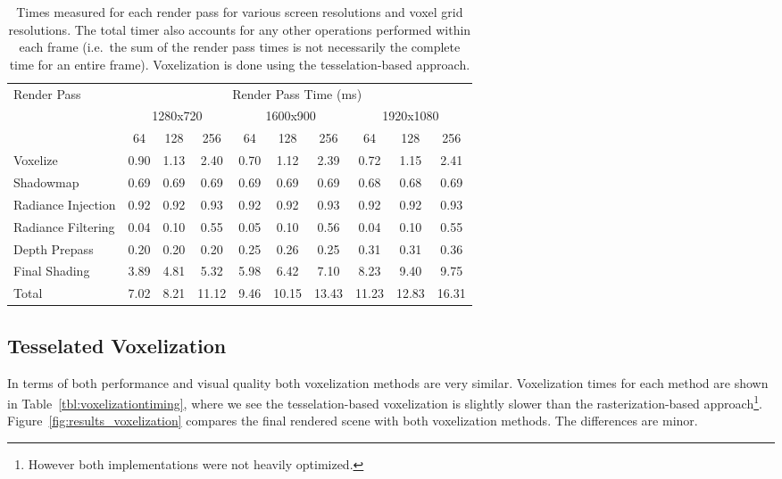 \begin{table}[H]
\centering
\begin{tabular}{l ccc ccc ccc}
\toprule
Render Pass & \multicolumn{9}{c}{Render Pass Time (ms)} \\
& \multicolumn{3}{c}{1280x720} & \multicolumn{3}{c}{1600x900} & \multicolumn{3}{c}{1920x1080} \\
& 64 & 128 & 256 & 64 & 128 & 256 & 64 & 128 & 256 \\
\midrule
Voxelize           & 0.90 & 1.13 & 2.40  & 0.70 & 1.12 & 2.39  & 0.72 & 1.15 & 2.41\\
Shadowmap          & 0.69 & 0.69 & 0.69  & 0.69 & 0.69 & 0.69  & 0.68 & 0.68 & 0.69\\
Radiance Injection & 0.92 & 0.92 & 0.93  & 0.92 & 0.92 & 0.93  & 0.92 & 0.92 & 0.93\\
Radiance Filtering & 0.04 & 0.10 & 0.55  & 0.05 & 0.10 & 0.56  & 0.04 & 0.10 & 0.55\\
Depth Prepass      & 0.20 & 0.20 & 0.20  & 0.25 & 0.26 & 0.25  & 0.31 & 0.31 & 0.36\\
Final Shading      & 3.89 & 4.81 & 5.32  & 5.98 & 6.42 & 7.10  & 8.23 & 9.40 & 9.75\\
\midrule
Total              & 7.02 & 8.21 & 11.12  & 9.46 & 10.15 & 13.43  & 11.23 & 12.83 & 16.31\\
\bottomrule
\end{tabular}
\caption{Times measured for each render pass for various screen resolutions and voxel grid resolutions. The total timer also accounts for any other operations performed within each frame (i.e.\ the sum of the render pass times is not necessarily the complete time for an entire frame). Voxelization is done using the tesselation-based approach.}
\label{tbl:renderpasstiming}
\end{table}

\subsection{Tesselated Voxelization}
In terms of both performance and visual quality both voxelization methods are very similar. Voxelization times for each method are shown in Table~\ref{tbl:voxelizationtiming}, where we see the tesselation-based voxelization is slightly slower than the rasterization-based approach\footnote{However both implementations were not heavily optimized.}. Figure~\ref{fig:results_voxelization} compares the final rendered scene with both voxelization methods. The differences are minor.

